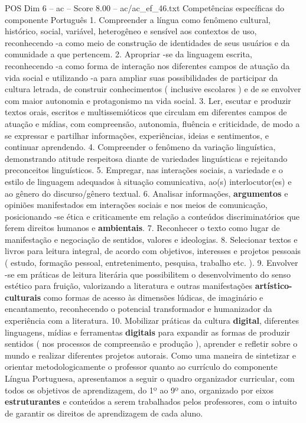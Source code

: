 \begin{textsample}{POS Dim 6 – ac – Score 8.00 – ac/ac\_ef\_46.txt}
Competências específicas do componente Português 1.
Compreender a língua como fenômeno cultural, histórico, social, variável, heterogêneo e sensível aos contextos de uso, reconhecendo -a como meio de construção de identidades de seus usuários e da comunidade a que pertencem. 2.
Apropriar -se da linguagem escrita, reconhecendo -a como forma de interação nos diferentes campos de atuação da vida social e utilizando -a para ampliar suas possibilidades de participar da cultura letrada, de construir conhecimentos ( inclusive escolares ) e de se envolver com maior autonomia e protagonismo na vida social. 3.
Ler, escutar e produzir textos orais, escritos e multissemióticos que circulam em diferentes campos de atuação e mídias, com compreensão, autonomia, fluência e criticidade, de modo a se expressar e partilhar informações, experiências, ideias e sentimentos, e continuar aprendendo. 4.
Compreender o fenômeno da variação linguística, demonstrando atitude respeitosa diante de variedades linguísticas e rejeitando preconceitos linguísticos. 5.
Empregar, nas interações sociais, a variedade e o estilo de linguagem adequados à situação comunicativa, ao(s) interlocutor(es) e ao gênero do discurso/gênero textual. 6.
Analisar informações, \textbf{argumentos} e opiniões manifestados em interações sociais e nos meios de comunicação, posicionando -se ética e criticamente em relação a conteúdos discriminatórios que ferem direitos humanos e \textbf{ambientais}. 7.
Reconhecer o texto como lugar de manifestação e negociação de sentidos, valores e ideologias. 8.
Selecionar textos e livros para leitura integral, de acordo com objetivos, interesses e projetos pessoais ( estudo, formação pessoal, entretenimento, pesquisa, trabalho etc. ). 9.
Envolver -se em práticas de leitura literária que possibilitem o desenvolvimento do senso estético para fruição, valorizando a literatura e outras manifestações \textbf{artístico-culturais} como formas de acesso às dimensões lúdicas, de imaginário e encantamento, reconhecendo o potencial transformador e humanizador da experiência com a literatura. 10.
Mobilizar práticas da cultura \textbf{digital}, diferentes linguagens, mídias e ferramentas \textbf{digitais} para expandir as formas de produzir sentidos ( nos processos de compreensão e produção ), aprender e refletir sobre o mundo e realizar diferentes projetos autorais.
Como uma maneira de sintetizar e orientar metodologicamente o professor quanto ao currículo do componente Língua Portuguesa, apresentamos a seguir o quadro organizador curricular, com todos os objetivos de aprendizagem, do 1º ao 9º ano, organizado por eixos \textbf{estruturantes} e conteúdos a serem trabalhados pelos professores, com o intuito de garantir os direitos de aprendizagem de cada aluno.

\end{textsample}
